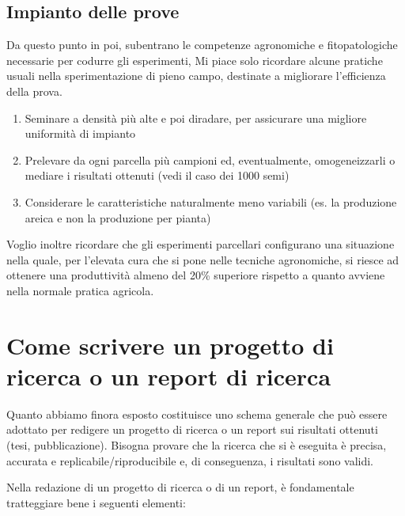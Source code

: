 \documentclass[a4paper,12pt,oneside]{book}
\providecommand{\tightlist}{%
  \setlength{\itemsep}{0pt}\setlength{\parskip}{0pt}}
\begin{document}
\subsection{Impianto delle prove}\label{impianto-delle-prove}

Da questo punto in poi, subentrano le competenze agronomiche e
fitopatologiche necessarie per codurre gli esperimenti, Mi piace solo
ricordare alcune pratiche usuali nella sperimentazione di pieno campo,
destinate a migliorare l'efficienza della prova.

\begin{enumerate}
\def\labelenumi{\arabic{enumi}.}
\tightlist
\item
  Seminare a densità più alte e poi diradare, per assicurare una
  migliore uniformità di impianto
\item
  Prelevare da ogni parcella più campioni ed, eventualmente,
  omogeneizzarli o mediare i risultati ottenuti (vedi il caso dei 1000
  semi)
\item
  Considerare le caratteristiche naturalmente meno variabili (es. la
  produzione areica e non la produzione per pianta)
\end{enumerate}

Voglio inoltre ricordare che gli esperimenti parcellari configurano una
situazione nella quale, per l'elevata cura che si pone nelle tecniche
agronomiche, si riesce ad ottenere una produttività almeno del 20\%
superiore rispetto a quanto avviene nella normale pratica agricola.

\section{Come scrivere un progetto di ricerca o un report di
ricerca}\label{come-scrivere-un-progetto-di-ricerca-o-un-report-di-ricerca}

Quanto abbiamo finora esposto costituisce uno schema generale che può
essere adottato per redigere un progetto di ricerca o un report sui
risultati ottenuti (tesi, pubblicazione). Bisogna provare che la ricerca
che si è eseguita è precisa, accurata e replicabile/riproducibile e, di
conseguenza, i risultati sono validi.

Nella redazione di un progetto di ricerca o di un report, è fondamentale
tratteggiare bene i seguenti elementi:
\end{document}
